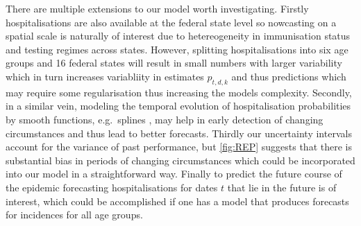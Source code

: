 There are multiple extensions to our model worth investigating. Firstly
hospitalisations are also available at the federal state level so
nowcasting on a spatial scale is naturally of interest due to
hetereogeneity in immunisation status and testing regimes across states.
However, splitting hospitalisations into six age groups and 16 federal
states will result in small numbers with larger variability which in
turn increases variabliity in estimates \(p_{t,d,k}\) and thus
predictions which may require some regularisation thus increasing the
models complexity. Secondly, in a similar vein, modeling the temporal
evolution of hospitalisation probabilities by smooth functions,
e.g.~splines
\citep{vandeKassteele2019Nowcasting,Schneble2021Nowcasting}, may help
in early detection of changing circumstances and thus lead to better
forecasts. Thirdly our uncertainty intervals account for the variance of
past performance, but \cref{fig:REP} suggests that there is
substantial bias in periods of changing circumstances which could be
incorporated into our model in a straightforward way. Finally to predict
the future course of the epidemic forecasting hospitalisations for dates
\(t\) that lie in the future is of interest, which could be accomplished
if one has a model that produces forecasts for incidences for all age
groups.